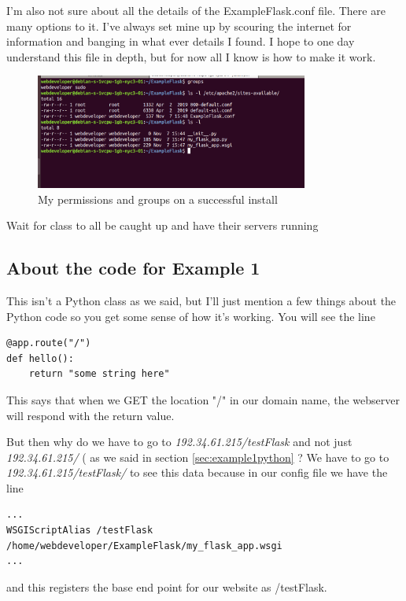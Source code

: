 \documentclass[10pt]{article}
\begin{document}
I'm also not sure about all the details of the ExampleFlask.conf file. There are many options to it. I've always set mine up by scouring the internet for information and banging in what ever details I found. I hope to one day understand this file in depth, but for now all I know is how to make it work.

\begin{figure}[h]
  \centering
    \includegraphics[width=0.8\textwidth]{groupsAndPermissions.png}
  \caption{My permissions and groups on a successful install}
\end{figure}

{\LARGE Wait for class to all be caught up and have their servers running}

\subsection{About the code for Example 1}
This isn't a Python class as we said, but I'll just mention a few things about the Python code so you get some sense of how it's working. You will see the line

\begin{lstlisting}[style=py]
@app.route("/")
def hello():
	return "some string here"
\end{lstlisting}
 
This says that when we GET the location "/" in our domain name, the webserver will respond with the return value.

But then why do we have to go to \textit{192.34.61.215/testFlask} and not just
\textit{192.34.61.215/} ( as we said in section \ref{sec:example1python} ? We
have to go to \textit{192.34.61.215/testFlask/} to see this data because in our config file we have the line

\begin{lstlisting}[style=sh]
...
WSGIScriptAlias /testFlask /home/webdeveloper/ExampleFlask/my_flask_app.wsgi
...
\end{lstlisting}

and this registers the base end point for our website as /testFlask.
\end{document}
